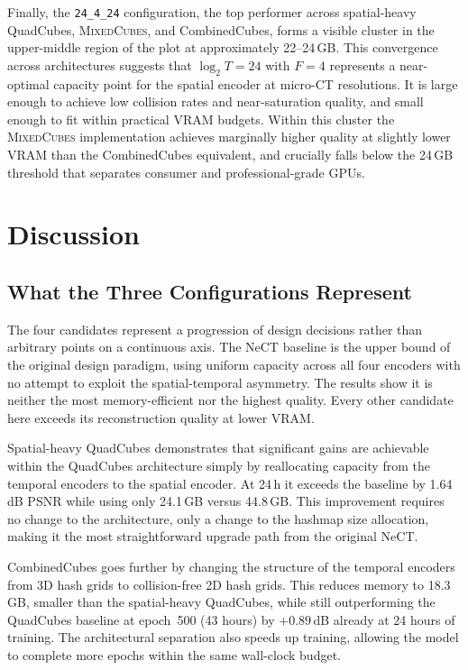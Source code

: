\documentclass[12pt, a4paper, twoside]{report}
\newcommand{\MixedCubes}{\textsc{MixedCubes}}
\begin{document}
Finally, the \texttt{24\_4\_24} configuration, the top performer across spatial-heavy QuadCubes, \MixedCubes{}, and CombinedCubes, forms a visible cluster in the upper-middle region of the plot at approximately 22--24\,GB. This convergence across architectures suggests that $\log_2 T = 24$ with $F = 4$ represents a near-optimal capacity point for the spatial encoder at micro-CT resolutions. It is large enough to achieve low collision rates and near-saturation quality, and small enough to fit within practical VRAM budgets. Within this cluster the \MixedCubes{} implementation achieves marginally higher quality at slightly lower VRAM than the CombinedCubes equivalent, and crucially falls below the 24\,GB threshold that separates consumer and professional-grade GPUs.

\section{Discussion}
\label{sec:comp_discussion}

\subsection{What the Three Configurations Represent}
\label{subsec:comp_disc_interpretation}

The four candidates represent a progression of design decisions rather than arbitrary points on a continuous axis. The NeCT baseline is the upper bound of the original design paradigm, using uniform capacity across all four encoders with no attempt to exploit the spatial-temporal asymmetry. The results show it is neither the most memory-efficient nor the highest quality. Every other candidate here exceeds its reconstruction quality at lower VRAM.

Spatial-heavy QuadCubes demonstrates that significant gains are achievable within the QuadCubes architecture simply by reallocating capacity from the temporal encoders to the spatial encoder. At 24\,h it exceeds the baseline by 1.64\,dB PSNR while using only 24.1\,GB versus 44.8\,GB. This improvement requires no change to the architecture, only a change to the hashmap size allocation, making it the most straightforward upgrade path from the original NeCT.

CombinedCubes goes further by changing the structure of the temporal encoders from 3D hash grids to collision-free 2D hash grids. This reduces memory to 18.3\,GB, smaller than the spatial-heavy QuadCubes, while still outperforming the QuadCubes baseline at epoch~500 (43 hours) by $+0.89$\,dB already at 24 hours of training. The architectural separation also speeds up training, allowing the model to complete more epochs within the same wall-clock budget.
\end{document}
